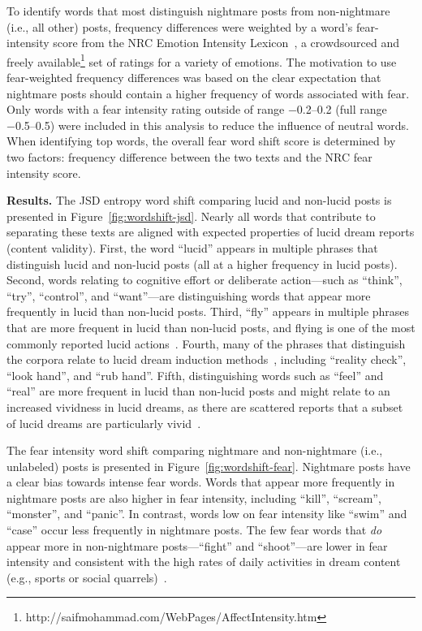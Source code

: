 \documentclass[10pt,a4paper,twocolumn]{article}
\begin{document}
\par
To identify words that most distinguish nightmare posts from non-nightmare (i.e., all other) posts, frequency differences were weighted by a word's fear-intensity score from the NRC Emotion Intensity Lexicon~\cite{mohammed2018}, a crowdsourced and freely available\footnote{http://saifmohammad.com/WebPages/AffectIntensity.htm} set of ratings for a variety of emotions. The motivation to use fear-weighted frequency differences was based on the clear expectation that nightmare posts should contain a higher frequency of words associated with fear. Only words with a fear intensity rating outside of range \numrange{-.2}{.2} (full range \numrange{-.5}{.5}) were included in this analysis to reduce the influence of neutral words. When identifying top words, the overall fear word shift score is determined by two factors: frequency difference between the two texts and the NRC fear intensity score.

\smallskip
\noindent
\textbf{Results.}
The JSD entropy word shift comparing lucid and non-lucid posts is presented in Figure~\ref{fig:wordshift-jsd}. Nearly all words that contribute to separating these texts are aligned with expected properties of lucid dream reports (content validity). First, the word ``lucid'' appears in multiple phrases that distinguish lucid and non-lucid posts (all at a higher frequency in lucid posts). Second, words relating to cognitive effort or deliberate action---such as ``think'', ``try'', ``control'', and ``want''---are distinguishing words that appear more frequently in lucid than non-lucid posts. Third, ``fly'' appears in multiple phrases that are more frequent in lucid than non-lucid posts, and flying is one of the most commonly reported lucid actions~\cite{stumbrys2014,motarolim2013,schadlich2012,barrett1991}. Fourth, many of the phrases that distinguish the corpora relate to lucid dream induction methods~\cite{stumbrys2012}, including ``reality check'', ``look hand'', and ``rub hand''. Fifth, distinguishing words such as ``feel'' and ``real'' are more frequent in lucid than non-lucid posts and might relate to an increased vividness in lucid dreams, as there are scattered reports that a subset of lucid dreams are particularly vivid~\cite{redditpaper}.

\par
The fear intensity word shift comparing nightmare and non-nightmare (i.e., unlabeled) posts is presented in Figure~\ref{fig:wordshift-fear}. Nightmare posts have a clear bias towards intense fear words. Words that appear more frequently in nightmare posts are also higher in fear intensity, including ``kill'', ``scream'', ``monster'', and ``panic''. In contrast, words low on fear intensity like ``swim'' and ``case'' occur less frequently in nightmare posts. The few fear words that \emph{do} appear more in non-nightmare posts---``fight'' and ``shoot''---are lower in fear intensity and consistent with the high rates of daily activities in dream content (e.g., sports or social quarrels)~\cite{schredl2010}.
\end{document}
